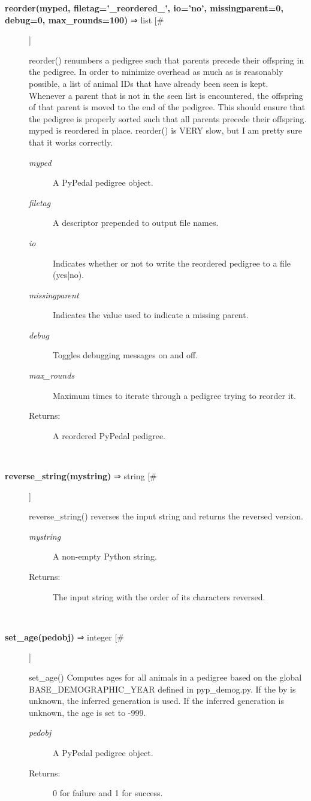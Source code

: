 \documentclass{article}
\begin{document}
\begin{description}
\item[\textbf{reorder(myped, filetag='\_reordered\_', io='no', missingparent=0, debug=0, max\_rounds=100)} ⇒ list [\#]
]
\par reorder() renumbers a pedigree such that parents precede their offspring in the
pedigree.  In order to minimize overhead as much as is reasonably possible,
a list of animal IDs that have already been seen is kept.  Whenever a parent
that is not in the seen list is encountered, the offspring of that parent is
moved to the end of the pedigree.  This should ensure that the pedigree is
properly sorted such that all parents precede their offspring.  myped is
reordered in place.  reorder() is VERY slow, but I am pretty sure that it works
correctly.
\begin{description}
\item[\textit{myped}
]
A PyPedal pedigree object.
\item[\textit{filetag}
]
A descriptor prepended to output file names.
\item[\textit{io}
]
Indicates whether or not to write the reordered pedigree to a file (yes|no).
\item[\textit{missingparent}
]
Indicates the value used to indicate a missing parent.
\item[\textit{debug}
]
Toggles debugging messages on and off.
\item[\textit{max\_rounds}
]
Maximum times to iterate through a pedigree trying to reorder it.
\item[Returns:
]
A reordered PyPedal pedigree.
\end{description}\\

\item[\textbf{reverse\_string(mystring)} ⇒ string [\#]
]
\par reverse\_string() reverses the input string and returns the reversed version.
\begin{description}
\item[\textit{mystring}
]
A non-empty Python string.
\item[Returns:
]
The input string with the order of its characters reversed.
\end{description}\\

\item[\textbf{set\_age(pedobj)} ⇒ integer [\#]
]
\par set\_age() Computes ages for all animals in a pedigree based on the global
BASE\_DEMOGRAPHIC\_YEAR defined in pyp\_demog.py.  If the by is unknown, the
inferred generation is used.  If the inferred generation is unknown, the
age is set to -999.
\begin{description}
\item[\textit{pedobj}
]
A PyPedal pedigree object.
\item[Returns:
]
0 for failure and 1 for success.
\end{description}\\


\end{description}
\end{document}
